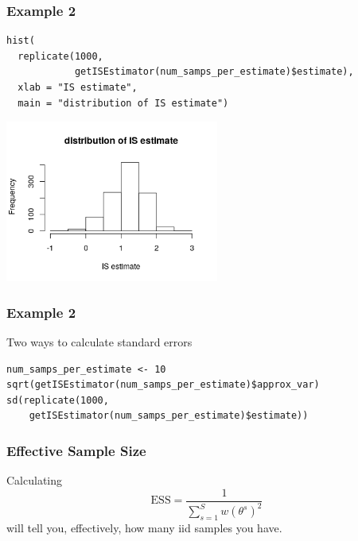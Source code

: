 \documentclass{beamer}
\begin{document}
\begin{frame}[fragile]
\frametitle{Example 2}

\begin{verbatim}
hist(
  replicate(1000, 
            getISEstimator(num_samps_per_estimate)$estimate),
  xlab = "IS estimate",
  main = "distribution of IS estimate") 
\end{verbatim}

\includegraphics[width=70mm]{is1_hist.png}


\end{frame}

\begin{frame}[fragile]
\frametitle{Example 2}

Two ways to calculate standard errors
\begin{verbatim}
num_samps_per_estimate <- 10
sqrt(getISEstimator(num_samps_per_estimate)$approx_var)  
sd(replicate(1000, 
    getISEstimator(num_samps_per_estimate)$estimate)) 
\end{verbatim}

\end{frame}

\begin{frame}[fragile]
\frametitle{Effective Sample Size}


Calculating
$$
\textrm{ESS} = \frac{1}{\sum_{s=1}^S w(\theta^s)^2}
$$
will tell you, effectively, how many iid samples you have. 


\end{frame}

\end{document}
